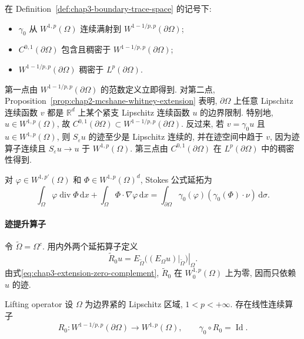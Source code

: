 \begin{Theorem}
\label{thm:chap3-trace-space-properties}
在 Definition~\ref{def:chap3-boundary-trace-space} 的记号下:
\begin{itemize}
\item $\gamma_0$ 从 $W^{1,p}(\Omega)$ 连续满射到 $W^{1-1/p,p}(\partial\Omega)$;
\item $C^{0,1}(\partial\Omega)$ 包含且稠密于 $W^{1-1/p,p}(\partial\Omega)$;
\item $W^{1-1/p,p}(\partial\Omega)$ 稠密于 $L^p(\partial\Omega)$.
\end{itemize}
\end{Theorem}

\begin{Proof}
第一点由 $W^{1-1/p,p}(\partial\Omega)$ 的范数定义立即得到. 对第二点, Proposition~\ref{prop:chap2-mcshane-whitney-extension} 表明, $\partial\Omega$ 上任意 Lipschitz 连续函数 $v$ 都是 $\mathbb R^d$ 上某个紧支 Lipschitz 连续函数 $u$ 的边界限制. 特别地, $u\in W^{1,p}(\Omega)$, 故 $C^{0,1}(\partial\Omega)\subset W^{1-1/p,p}(\partial\Omega)$. 反过来, 若 $v=\gamma_0u$ 且 $u\in W^{1,p}(\Omega)$, 则 $S_\varepsilon u$ 的迹至少是 Lipschitz 连续的, 并在迹空间中趋于 $v$, 因为迹算子连续且 $S_\varepsilon u\to u$ 于 $W^{1,p}(\Omega)$. 第三点由 $C^{0,1}(\partial\Omega)$ 在 $L^p(\partial\Omega)$ 中的稠密性得到.
\end{Proof}

对 $\varphi\in W^{1,p'}(\Omega)$ 和 $\Phi\in W^{1,p}(\Omega)^d$, Stokes 公式延拓为
\begin{equation}
 \int_\Omega\varphi\operatorname{div}\Phi\,\mathrm dx
 +\int_\Omega\Phi\cdot\nabla\varphi\,\mathrm dx
 =\int_{\partial\Omega}\gamma_0(\varphi)(\gamma_0(\Phi)\cdot\nu)\,\mathrm d\sigma.
 \label{eq:chap3-sobolev-stokes-formula}
\end{equation}

\paragraph{迹提升算子}

令 $\widetilde\Omega=\Omega^c$. 用内外两个延拓算子定义
\[
 \widetilde R_0u=\left.E_{\widetilde\Omega}\bigl((E_\Omega u)|_{\widetilde\Omega}\bigr)\right|_\Omega.
\]
由式\eqref{eq:chap3-extension-zero-complement}, $\widetilde R_0$ 在 $W_0^{1,p}(\Omega)$ 上为零, 因而只依赖 $u$ 的迹.

\begin{Theorem}{Lifting operator}
\label{thm:chap3-trace-lifting-operator}
设 $\Omega$ 为边界紧的 Lipschitz 区域, $1<p<+\infty$. 存在线性连续算子
\[
 R_0:W^{1-1/p,p}(\partial\Omega)\longrightarrow W^{1,p}(\Omega),
 \qquad\gamma_0\circ R_0=\operatorname{Id}.
\]
\end{Theorem}

